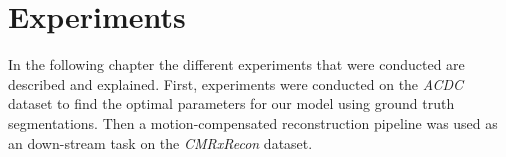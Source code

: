 \section{Experiments} \label{Sec:Experiments}
In the following chapter the different experiments that were conducted are described and explained. 
First, experiments were conducted on the \emph{ACDC} dataset to find the optimal parameters for our model using ground truth segmentations. Then a motion-compensated reconstruction pipeline was used as an down-stream task on the \emph{CMRxRecon} dataset.


